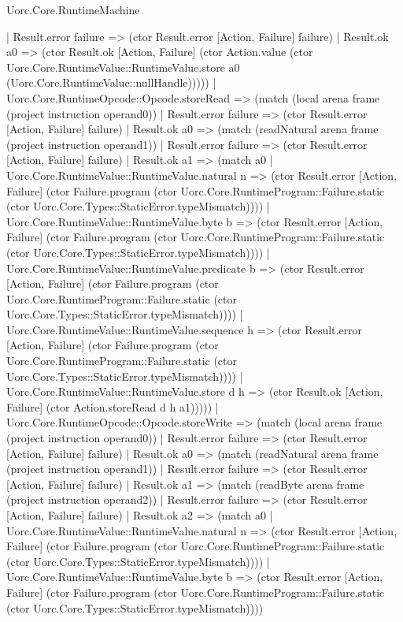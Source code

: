 \begin{lexlean}{Uorc.Core.RuntimeMachine}
\begin{semanticmodule}
{      | Result.error failure => (ctor Result.error [Action, Failure] failure)
      | Result.ok a0 => (ctor Result.ok [Action, Failure] (ctor Action.value (ctor Uorc.Core.RuntimeValue::RuntimeValue.store a0 (Uorc.Core.RuntimeValue::nullHandle)))))
    | Uorc.Core.RuntimeOpcode::Opcode.storeRead => (match (local arena frame (project instruction operand0))
      | Result.error failure => (ctor Result.error [Action, Failure] failure)
      | Result.ok a0 => (match (readNatural arena frame (project instruction operand1))
        | Result.error failure => (ctor Result.error [Action, Failure] failure)
        | Result.ok a1 => (match a0
          | Uorc.Core.RuntimeValue::RuntimeValue.natural n => (ctor Result.error [Action, Failure] (ctor Failure.program (ctor Uorc.Core.RuntimeProgram::Failure.static (ctor Uorc.Core.Types::StaticError.typeMismatch))))
          | Uorc.Core.RuntimeValue::RuntimeValue.byte b => (ctor Result.error [Action, Failure] (ctor Failure.program (ctor Uorc.Core.RuntimeProgram::Failure.static (ctor Uorc.Core.Types::StaticError.typeMismatch))))
          | Uorc.Core.RuntimeValue::RuntimeValue.predicate b => (ctor Result.error [Action, Failure] (ctor Failure.program (ctor Uorc.Core.RuntimeProgram::Failure.static (ctor Uorc.Core.Types::StaticError.typeMismatch))))
          | Uorc.Core.RuntimeValue::RuntimeValue.sequence h => (ctor Result.error [Action, Failure] (ctor Failure.program (ctor Uorc.Core.RuntimeProgram::Failure.static (ctor Uorc.Core.Types::StaticError.typeMismatch))))
          | Uorc.Core.RuntimeValue::RuntimeValue.store d h => (ctor Result.ok [Action, Failure] (ctor Action.storeRead d h a1)))))
    | Uorc.Core.RuntimeOpcode::Opcode.storeWrite => (match (local arena frame (project instruction operand0))
      | Result.error failure => (ctor Result.error [Action, Failure] failure)
      | Result.ok a0 => (match (readNatural arena frame (project instruction operand1))
        | Result.error failure => (ctor Result.error [Action, Failure] failure)
        | Result.ok a1 => (match (readByte arena frame (project instruction operand2))
          | Result.error failure => (ctor Result.error [Action, Failure] failure)
          | Result.ok a2 => (match a0
            | Uorc.Core.RuntimeValue::RuntimeValue.natural n => (ctor Result.error [Action, Failure] (ctor Failure.program (ctor Uorc.Core.RuntimeProgram::Failure.static (ctor Uorc.Core.Types::StaticError.typeMismatch))))
            | Uorc.Core.RuntimeValue::RuntimeValue.byte b => (ctor Result.error [Action, Failure] (ctor Failure.program (ctor Uorc.Core.RuntimeProgram::Failure.static (ctor Uorc.Core.Types::StaticError.typeMismatch))))
}
\end{semanticmodule}
\end{lexlean}
